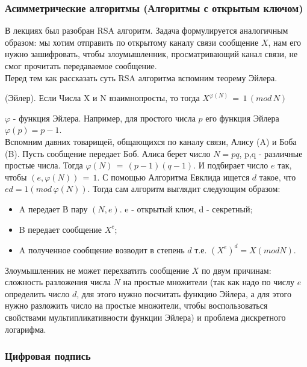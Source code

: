 \subsubsection{Асимметрические алгоритмы (Алгоритмы с открытым ключом)}

В лекциях был разобран  RSA алгоритм. Задача формулируется аналогичным образом: мы хотим отправить по открытому каналу связи сообщение $X$, нам его нужно зашифровать, чтобы злоумышленник, просматривающий канал связи, не смог прочитать передаваемое сообщение. \\

Перед тем как рассказать суть RSA алгоритма вспомним теорему Эйлера. \\
\begin{theorem} (Эйлер). Если Числа X и N взаимнопросты, то тогда $X^{\varphi (N)} \, = \, 1 \, (mod \, N)$ \end{theorem}
$\varphi$ - функция Эйлера. Например, для простого числа $p$ его функция Эйлера $\varphi (p) = p - 1$. \\

Вспомним давних товарищей, общающихся по каналу связи, Алису (A) и Боба (B). Пусть сообщение передает Боб.
Алиса берет число $N = pq$, p,q - различные простые числа. Тогда $\varphi (N) \, = \, (p - 1)(q - 1)$. И подбирает число $e$ так, чтобы $(e, \varphi(N)) \, = \,1$. С помощью Алгоритма Евклида ищется $d$ такое, что  $ed = 1 (mod \, \varphi (N))$. Тогда сам алгоритм выглядит следующим образом:
\begin {itemize}
\item A передает В пару $(N, e)$. e - открытый ключ, d - секретный;
\item B передает сообщение $X^e$;
\item A полученное сообщение возводит в степень $d$ т.е. $(X^e)^d = X (mod N)$.
\end {itemize}

Злоумышленник не может перехватить сообщение $X$ по двум причинам: сложность разложения числа $N$ на простые множители (так как надо по числу $e$ определить число $d$, для этого нужно посчитать функцию Эйлера, а для этого нужно разложить число на простые множители, чтобы воспользоваться свойствами мультипликативности функции Эйлера) и проблема дискретного логарифма.

\subsubsection{Цифровая подпись}


